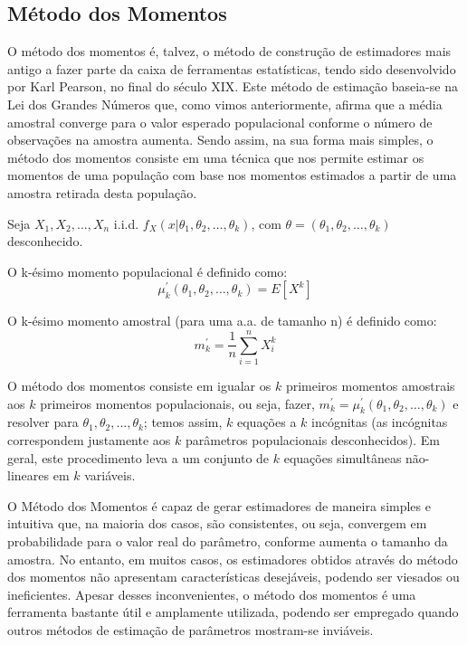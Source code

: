 \documentclass[
]{book}
\theoremstyle{definition}
\theoremstyle{definition}
\theoremstyle{definition}
\theoremstyle{remark}
\begin{document}
\hypertarget{muxe9todo-dos-momentos}{%
\subsection*{Método dos Momentos}\label{muxe9todo-dos-momentos}}

O método dos momentos é, talvez, o método de construção de estimadores mais antigo a fazer parte da caixa de ferramentas estatísticas, tendo sido desenvolvido por Karl Pearson, no final do século XIX.
Este método de estimação baseia-se na Lei dos Grandes Números que, como vimos anteriormente, afirma que a média amostral converge para o valor esperado populacional conforme o número de observações na amostra aumenta. Sendo assim, na sua forma mais simples, o método dos momentos consiste em uma técnica que nos permite estimar os momentos de uma população com base nos momentos estimados a partir de uma amostra retirada desta população.

Seja \(X_1, X_2, \ldots, X_n\) i.i.d. \(f_X(x| \theta_1, \theta_2, \ldots, \theta_k)\), com \(\theta = (\theta_1, \theta_2, \ldots, \theta_k)\) desconhecido.

O k-ésimo momento populacional é definido como:
\[\mu_k^\prime(\theta_1, \theta_2, \ldots, \theta_k) = E[X^k]\]

O k-ésimo momento amostral (para uma a.a. de tamanho n) é definido como:
\[m_k^\prime  = \frac{1}{n}\sum_{i=1}^n X_i^k\]

O método dos momentos consiste em igualar os \(k\) primeiros momentos amostrais aos \(k\) primeiros momentos populacionais, ou seja, fazer, \(m_k^\prime = \mu_k^\prime(\theta_1, \theta_2, \ldots, \theta_k)\) e resolver para \(\theta_1, \theta_2, \ldots, \theta_k\); temos assim, \(k\) equações a \(k\) incógnitas (as incógnitas correspondem justamente aos \(k\) parâmetros populacionais desconhecidos). Em geral, este procedimento leva a um conjunto de \(k\) equações simultâneas não-lineares em \(k\) variáveis.

O Método dos Momentos é capaz de gerar estimadores de maneira simples e intuitiva que, na maioria dos casos, são consistentes, ou seja, convergem em probabilidade para o valor real do parâmetro, conforme aumenta o tamanho da amostra. No entanto, em muitos casos, os estimadores obtidos através do método dos momentos não apresentam características desejáveis, podendo ser viesados ou ineficientes. Apesar desses inconvenientes, o método dos momentos é uma ferramenta bastante útil e amplamente utilizada, podendo ser empregado quando outros métodos de estimação de parâmetros mostram-se inviáveis.
\end{document}

